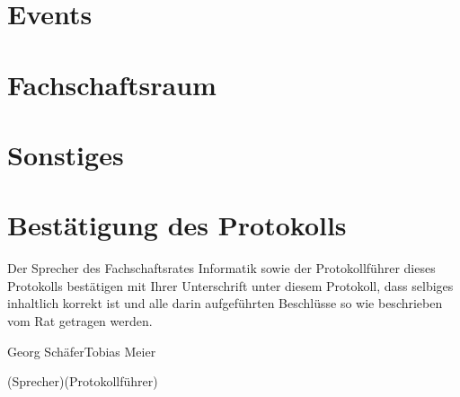 \documentclass[a4paper, 11pt]{article} %
\newcommand{\TeXer}{Tobias Meier}
\newcommand{\fsiPresident}{Georg Schäfer}
\begin{document}
\section{Events}

\section{Fachschaftsraum}

\section{Sonstiges}

\pagebreak
\section{Bestätigung des Protokolls}
Der Sprecher des Fachschaftsrates Informatik sowie der Protokollführer dieses Protokolls bestätigen mit Ihrer Unterschrift unter diesem Protokoll, dass selbiges inhaltlich korrekt ist und alle darin aufgeführten Beschlüsse so wie beschrieben vom Rat getragen werden.
\\

\vspace{3.5cm}
\hrulefill \hfill \hrulefill

\fsiPresident \hfill \TeXer

{\footnotesize (Sprecher)\hfill (Protokollführer)}
\end{document}
